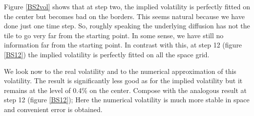 \documentclass[a4paper]{article}
\begin{document}
Figure \ref{BS2vol} shows that at step two, the implied
volatility is perfectly fitted on the center but becomes bad on
the borders. This seems natural because we have done just one
time step. So, roughly speaking the underlying diffusion has not
the tile to go very far from the starting point. In some sense,
we have still no information far from the starting point. In
contrast with this, at step 12 (figure \ref{BS12}) the implied
volatility is perfectly fitted on all the space grid.

We look now to the real volatility and to the numerical
approximation of this volatility. The result is significantly less
good as for the implied volatility but it remains at the level of
0.4$\%$ on the center. Compose with the analogous result at step
12 (figure \ref{BS12}); Here the numerical volatility is much more
stable in space and convenient error is obtained.
\end{document}
